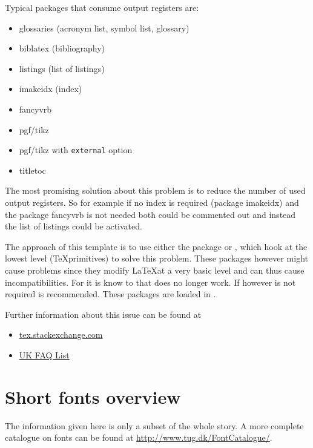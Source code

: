 Typical packages that consume output registers are:
\begin{itemize}
\item glossaries (acronym list, symbol list, glossary)
\item biblatex (bibliography)
\item listings (list of listings)
\item imakeidx (index)
\item fancyvrb 
\item pgf/tikz
\item pgf/tikz with \texttt{external} option
\item titletoc
\end{itemize}

The most promising solution about this problem is to reduce the number of used output registers. So for example if no index is required (package imakeidx) and the package fancyvrb is not needed both could be commented out and instead the list of listings could be activated.

The approach of this template is to use either the package  or , which hook at the lowest level (\TeX primitives) to solve this problem. These packages however might cause problems since they modify \LaTeX at a very basic level and can thus cause incompatibilities. For  it is know to that  does no longer work. If however  is not required  is recommended.
These packages are loaded in .

Further information about this issue can be found at
\begin{itemize}
\item \href{http://tex.stackexchange.com/questions/15665/making-efficient-use-of-writes}{tex.stackexchange.com}
\item \href{http://www.tex.ac.uk/cgi-bin/texfaq2html?label=noroom}{UK FAQ List}
\end{itemize}

\chapter{Short fonts overview}
\label{chap:doc:fonts}

The information given here is only a subset of the whole story. A more complete catalogue on \latex fonts can be found at \href{http://www.tug.dk/FontCatalogue/}{http://www.tug.dk/FontCatalogue/}.


